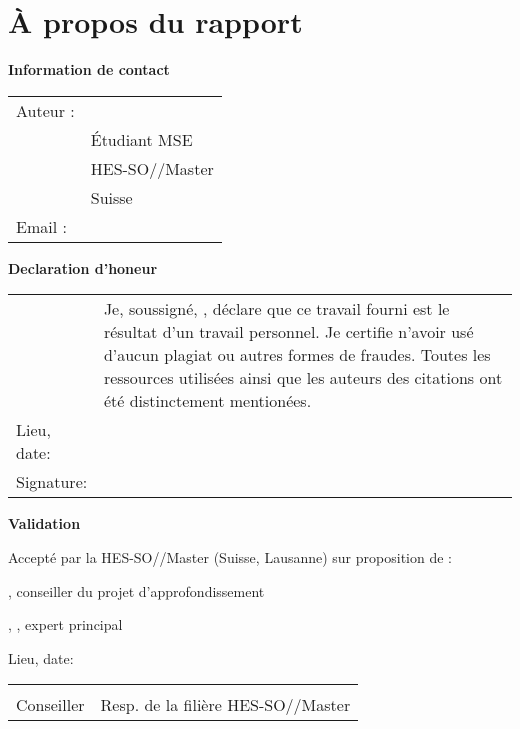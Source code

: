 \setlength{\parindent}{0pt}

\chapter*{À propos du rapport}

\vspace{\fill}

\textbf{Information de contact}

\begin{tabularx}{\textwidth}{N{2.5cm}X}
	Auteur :	 & \AuthorFirstName \ \AuthorLastName \\
	& Étudiant MSE \\
	& HES-SO//Master \\
	& Suisse \\
	Email : & \email{\AuthorEmail}
\end{tabularx}

\vspace{\fill}

\textbf{Declaration d'honeur}

{\renewcommand{\arraystretch}{2}
\begin{tabularx}{\textwidth}{N{2.5cm}X}
	& Je, soussigné, \Author, déclare que ce travail fourni est le résultat d'un travail personnel. Je certifie n'avoir usé d'aucun plagiat ou autres formes de fraudes. Toutes les ressources utilisées ainsi que les auteurs des citations ont été distinctement mentionées. \\

	Lieu, date: & \underline{\hspace{7cm}} \\
	Signature: & \underline{\hspace{7cm}}
\end{tabularx}
}

\vspace{\fill}

\textbf{Validation}

Accepté par la HES-SO//Master (Suisse, Lausanne) sur proposition de :

\vspace{0.5cm}

\Advisor, conseiller du projet d’approfondissement

\Expert, \ExpertLab, expert principal

\vspace{1cm}

Lieu, date: \underline{\hspace{8cm}}

\vspace{3cm}

{ \renewcommand{\arraystretch}{1.5}
\begin{tabularx}{\textwidth}{X X}
	\Advisor  & \Dean\\
	Conseiller   & Resp. de la filière HES-SO//Master\\
\end{tabularx}
}

\setlength{\parindent}{15pt}
